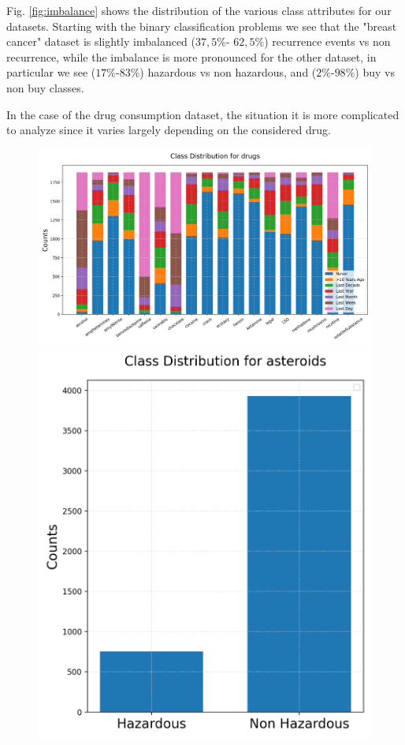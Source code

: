 \documentclass{article}
\begin{document}
Fig. \ref{fig:imbalance} shows the distribution of the various class attributes for our datasets. Starting with the binary classification problems we see that the "breast cancer" dataset is slightly imbalanced
($37,5\%$- $62,5\%$) recurrence events vs non recurrence, while the imbalance is more pronounced for the other dataset, in particular we see
($17\%$-$83\%$) hazardous vs non hazardous, and ($2\%$-$98\%$) buy vs  non buy classes.

In the case of the drug consumption dataset, the situation it is more complicated to analyze since it varies largely depending on the considered drug.

\begin{figure}[h!]
	\centering
	\begin{minipage}[b]{0.99\textwidth}
		\includegraphics[width=\textwidth]{Plots/Inbalance_drugs.png}
	\end{minipage}
	\begin{minipage}[b]{0.32\textwidth}
	\includegraphics[width=\textwidth]{Plots/Inbalance_asteroids.png}

\end{minipage}
\end{figure}
\end{document}
